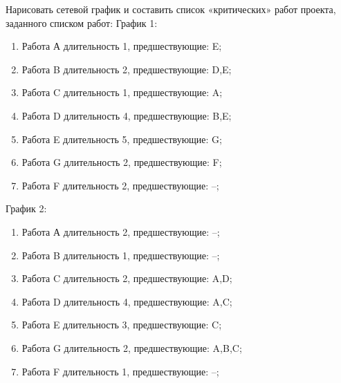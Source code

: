 \question
Нарисовать сетевой график и составить список «критических»
работ проекта, заданного списком работ:
График 1:
\begin{enumerate}
\item  Работа А длительность 1, предшествующие: E;
\item  Работа B длительность 2, предшествующие: D,E;
\item  Работа C длительность 1, предшествующие: A;
\item  Работа D длительность 4, предшествующие: B,E;
\item  Работа E длительность 5, предшествующие: G;
\item  Работа G длительность 2, предшествующие: F;
\item  Работа F длительность 2, предшествующие: --;
\end{enumerate}
График 2:
\begin{enumerate}
\item  Работа А длительность 2, предшествующие: --;
\item  Работа B длительность 1, предшествующие: --;
\item  Работа C длительность 2, предшествующие: A,D;
\item  Работа D длительность 4, предшествующие: A,C;
\item  Работа E длительность 3, предшествующие: C;
\item  Работа G длительность 2, предшествующие: A,B,C;
\item  Работа F длительность 1, предшествующие: --;
\end{enumerate}